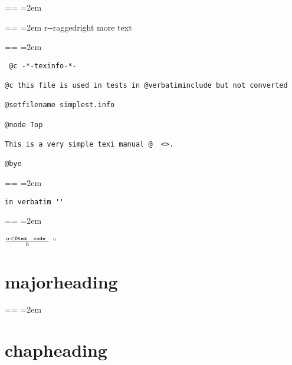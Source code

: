 \documentclass{book}
\makeatletter
\newenvironment{GNUTexinfopreformatted}{%
  \par\obeylines\obeyspaces\frenchspacing
  \parskip=\z@\parindent=\z@}{}
\newcommand{\GNUTexinfoplaceholder}[1]{}
\newcommand{\GNUTexinfonopagebreakheading}[2]{\let\clearpage\relax \let\cleardoublepage\relax \let\thispagestyle\GNUTexinfoplaceholder #1{#2}}
\makeatother
\begin{document}
\begin{GNUTexinfopreformatted}
\leftskip=2em\relax\ttfamily%

\end{GNUTexinfopreformatted}
\begin{flushleft}
\begin{GNUTexinfopreformatted}
\leftskip=2em\relax\ttfamily%
r{-}{-}raggedright
more text
\end{GNUTexinfopreformatted}
\end{flushleft}
\begin{GNUTexinfopreformatted}
\leftskip=2em\relax\ttfamily%

\end{GNUTexinfopreformatted}
\begin{verbatim}
 @c -*-texinfo-*-

@c this file is used in tests in @verbatiminclude but not converted

@setfilename simplest.info

@node Top

This is a very simple texi manual @  <>.

@bye
\end{verbatim}
\begin{GNUTexinfopreformatted}
\leftskip=2em\relax\ttfamily%

\end{GNUTexinfopreformatted}
\begin{verbatim}
in verbatim ''
\end{verbatim}
\begin{GNUTexinfopreformatted}
\leftskip=2em\relax\ttfamily%





$\frac{a < b \texttt{tex \hbox{ code }}}{b}$ ``

\end{GNUTexinfopreformatted}
\GNUTexinfonopagebreakheading{\chapter*}{{majorheading}}
\begin{GNUTexinfopreformatted}
\leftskip=2em\relax\ttfamily%

\end{GNUTexinfopreformatted}
\GNUTexinfonopagebreakheading{\chapter*}{{chapheading}}
\end{document}
